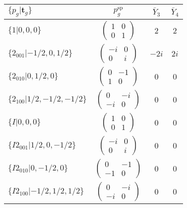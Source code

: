 \documentclass[3p,preprint]{elsarticle}
\newcommand{\bt}{\bm{t}}
\begin{document}
\begin{table}[H]
	\begin{tabular}{|l|c||c|c|}\hline
			$\{p_g|\bt_g\}$ & $p_g^{\text{sp}}$ & $\bar{Y}_3$ & $\bar{Y}_4$  \\ \hline \hline
			$\{1|0,0,0\}$ & 					$\left(\begin{array}{cc} 1&0 \\ 0&1 \end{array}\right)$	& $2$ &  $2$ \\ \hline
			$\{2_{001}|-1/2,0,1/2\}$ &		$\left(\begin{array}{cc} -i&0 \\ 0&i \end{array}\right)$	& $-2i$ & $2i$  \\ \hline
			$\{2_{010}|0,1/2,0\}$ &			$\left(\begin{array}{cc} 0&-1 \\ 1&0 \end{array}\right)$	& $0$ & $0$\\ \hline
			$\{2_{100}|1/2,-1/2,-1/2\}$ &		$\left(\begin{array}{cc} 0&-i \\ -i&0 \end{array}\right)$	& $0$ & $0$\\ \hline
			$\{I|0,0,0\}$ & 						$\left(\begin{array}{cc} 1&0 \\ 0&1 \end{array}\right)$	& $0$ &  $0$\\ \hline
			$\{I2_{001}|1/2,0,-1/2\}$ &		$\left(\begin{array}{cc} -i&0 \\ 0&i \end{array}\right)$	& $0$ & $0$  \\ \hline
			$\{I2_{010}|0,-1/2,0\}$ &			$\left(\begin{array}{cc} 0&-1 \\ -1&0 \end{array}\right)$	& $0$ & $0$\\ \hline
			$\{I2_{100}|-1/2,1/2,1/2\}$ &		$\left(\begin{array}{cc} 0&-i \\ -i&0 \end{array}\right)$	& $0$ & $0$\\ \hline
	\end{tabular}
\end{table}
\end{document}
